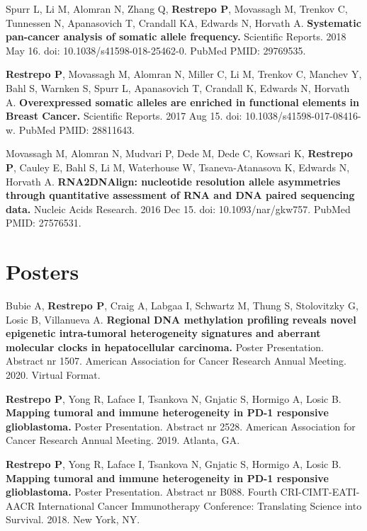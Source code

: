 \begin{minipage}[t]{0.675\textwidth}
\begin{tightitemize}
\item Spurr L, Li M, Alomran N, Zhang Q, \textbf{Restrepo P}, Movassagh M, Trenkov C, Tunnessen N, Apanasovich T, Crandall KA, Edwards N, Horvath A. \textbf{Systematic pan-cancer analysis of somatic allele frequency.} Scientific Reports. 2018 May 16. doi: 10.1038/s41598-018-25462-0. PubMed PMID: 29769535.

\item \textbf{Restrepo P}, Movassagh M, Alomran N, Miller C, Li M, Trenkov C, Manchev Y, Bahl S, Warnken S, Spurr L, Apanasovich T, Crandall K, Edwards N, Horvath A. \textbf{Overexpressed somatic alleles are enriched in functional elements in Breast Cancer.} Scientific Reports. 2017 Aug 15. doi: 10.1038/s41598-017-08416-w. PubMed PMID: 28811643.

\item Movassagh M, Alomran N, Mudvari P, Dede M, Dede C, Kowsari K, \textbf{Restrepo P}, Cauley E, Bahl S, Li M, Waterhouse W, Tsaneva-Atanasova K, Edwards N, Horvath A. \textbf{RNA2DNAlign: nucleotide resolution allele asymmetries through quantitative assessment of RNA and DNA paired sequencing data.} Nucleic Acids Research. 2016 Dec 15. doi: 10.1093/nar/gkw757. PubMed PMID: 27576531.
\end{tightitemize}

\section{Posters}
\vspace{\topsep} %
\begin{tightitemize}
\item Bubie A, \textbf{Restrepo P}, Craig A, Labgaa I, Schwartz M, Thung S, Stolovitzky G, Losic B, Villanueva A. \textbf{Regional DNA methylation profiling reveals novel epigenetic intra-tumoral heterogeneity signatures and aberrant molecular clocks in hepatocellular carcinoma.} Poster Presentation. Abstract nr 1507. American Association for Cancer Research Annual Meeting. 2020. Virtual Format.
\item \textbf{Restrepo P}, Yong R, Laface I, Tsankova N, Gnjatic S, Hormigo A, Losic B. \textbf{Mapping tumoral and immune heterogeneity in PD-1 responsive glioblastoma.} Poster Presentation. Abstract nr 2528. American Association for Cancer Research Annual Meeting. 2019. Atlanta, GA.
\item \textbf{Restrepo P}, Yong R, Laface I, Tsankova N, Gnjatic S, Hormigo A, Losic B. \textbf{Mapping tumoral and immune heterogeneity in PD-1 responsive glioblastoma.} Poster Presentation. Abstract nr B088. Fourth CRI-CIMT-EATI-AACR International Cancer Immunotherapy Conference: Translating Science into Survival. 2018. New York, NY.
\end{tightitemize}


\end{minipage}
